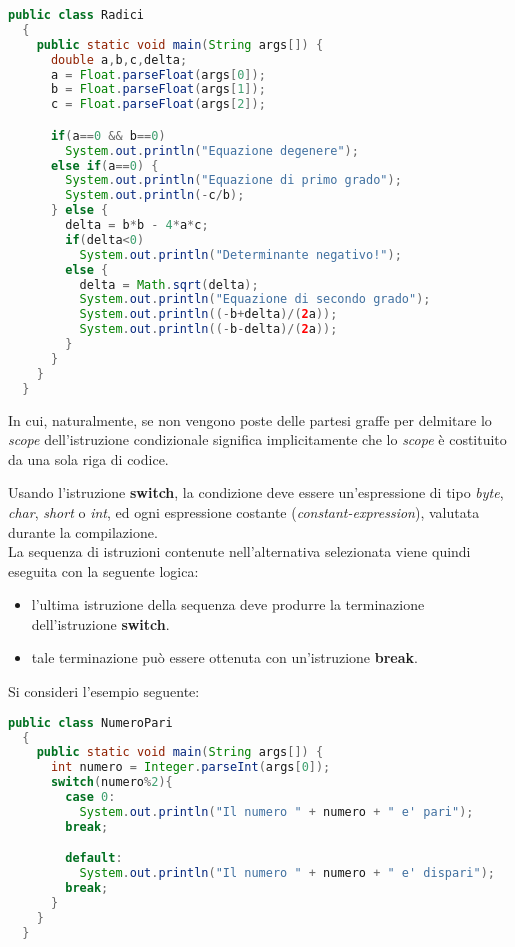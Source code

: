 \documentclass[a4paper]{extarticle}
\begin{document}
\vspace{1em}
\noindent
\begin{lstlisting}[language=Java, caption=Calcolo delle radici in Java]
  public class Radici
  {
    public static void main(String args[]) {
      double a,b,c,delta;
      a = Float.parseFloat(args[0]);
      b = Float.parseFloat(args[1]);
      c = Float.parseFloat(args[2]);

      if(a==0 && b==0)
        System.out.println("Equazione degenere");
      else if(a==0) {
        System.out.println("Equazione di primo grado");
        System.out.println(-c/b);
      } else {
        delta = b*b - 4*a*c;
        if(delta<0)
          System.out.println("Determinante negativo!");
        else {
          delta = Math.sqrt(delta);
          System.out.println("Equazione di secondo grado");
          System.out.println((-b+delta)/(2a));
          System.out.println((-b-delta)/(2a));
        }
      }
    }
  }
\end{lstlisting}

\vspace{1em}
\noindent
In cui, naturalmente, se non vengono poste delle partesi graffe per delmitare lo \emph{scope} dell'istruzione condizionale significa implicitamente che lo \emph{scope} è costituito da una sola riga di codice.

\vspace{1em}
\noindent
Usando l'istruzione \textbf{switch}, la condizione deve essere un'espressione di tipo \emph{byte}, \emph{char}, \emph{short} o \emph{int}, ed ogni espressione costante (\emph{constant-expression}), valutata durante la compilazione.\\
La sequenza di istruzioni contenute nell’alternativa selezionata viene quindi eseguita con la seguente logica:
\begin{itemize}
  \item l'ultima istruzione della sequenza deve produrre la terminazione dell’istruzione \textbf{switch}.
  \item tale terminazione può essere ottenuta con un'istruzione \textbf{break}.
\end{itemize}

\vspace{1em}
\noindent
Si consideri l'esempio seguente:

\vspace{1em}
\noindent
\begin{lstlisting}[language=Java, caption=Esempio istruzione condiziale in Java]
  public class NumeroPari
  {
    public static void main(String args[]) {
      int numero = Integer.parseInt(args[0]);
      switch(numero%2){
        case 0:
          System.out.println("Il numero " + numero + " e' pari");
        break;

        default:
          System.out.println("Il numero " + numero + " e' dispari");
        break;
      }
    }
  }
\end{lstlisting}
\end{document}
